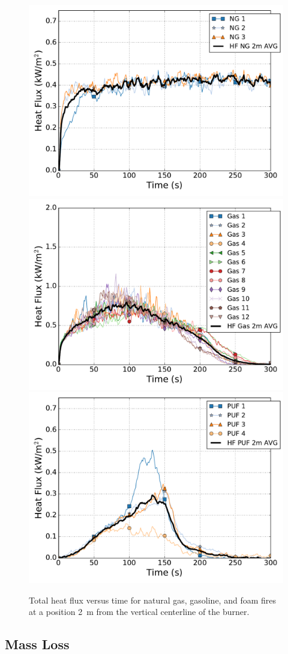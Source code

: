\documentclass[twoside]{uocthesis}
\begin{document}
{\begin{figure}[p]
  \centering
  \includegraphics[width=.635\columnwidth]{../Figures/HF_NG_2m}\\
  \includegraphics[width=.635\columnwidth]{../Figures/HF_Gas_2m}\\
  \includegraphics[width=.635\columnwidth]{../Figures/HF_PUF_2m}\\
  \caption[Total heat flux versus time for natural gas, gasoline, and foam fires at 2~m]{Total heat flux versus time for natural gas, gasoline, and foam fires at a position 2~m from the vertical centerline of the burner.}
  \label{Flux_2m}
\end{figure}

\subsection{Mass Loss}

}
\end{document}
